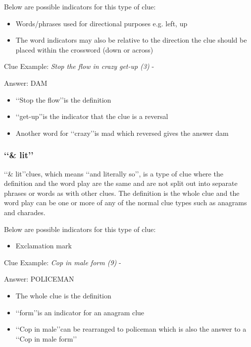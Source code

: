 Below are possible indicators for this type of clue: 
\begin{itemize}
	\item Words/phrases used for directional purposes e.g. left, up 
	\item The word indicators may also be relative to the direction the clue should be placed within the crossword (down or across) 
\\
\end{itemize}

Clue Example: \emph{Stop the flow in crazy get-up (3)} - \citep{shuchiReversals08}

Answer: DAM 

\begin{itemize}
	\item \lq\lq Stop the flow\rq\rq is the definition 
	\item \lq\lq get-up\rq\rq is the indicator that the clue is a reversal 
	\item Another word for \lq\lq crazy\rq\rq is mad which reversed gives the answer dam 
\end{itemize}

\subsubsection{\lq\lq \& lit\rq\rq}

\lq\lq \& lit\rq\rq clues, which means \lq\lq and literally so\rq\rq, is a type of clue where the definition and the word play are the same and are not split out into separate phrases or words as with other clues. The definition is the whole clue and the word play can be one or more of any of the normal clue types such as anagrams and charades. 

Below are possible indicators for this type of clue:
\begin{itemize} 
	\item Exclamation mark
\\
\end{itemize}

Clue Example: \emph{Cop in male form (9)}   - \citep{shuchiLit08} 

Answer: POLICEMAN 

\begin{itemize}
	\item The whole clue is the definition 
	\item \lq\lq form\rq\rq is an indicator for an anagram clue 
	\item \lq\lq Cop in male\rq\rq can be rearranged to policeman which is also the answer to a \lq\lq Cop in male form\rq\rq 
\end{itemize}

